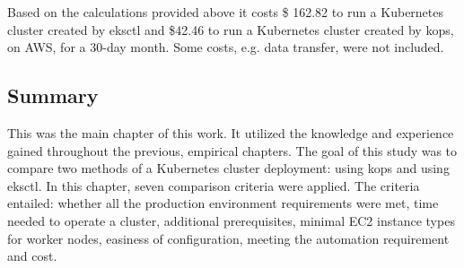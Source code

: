 Based on the calculations provided above it costs \$ 162.82 to run a Kubernetes cluster created by eksctl and \$42.46 to run a Kubernetes cluster created by kops, on AWS, for a 30-day month. Some costs, e.g. data transfer, were not included.




\subsection{Summary}

This was the main chapter of this work. It utilized the knowledge and experience gained throughout the previous, empirical chapters. The goal of this study was to compare two methods of a Kubernetes cluster deployment: using kops and using eksctl. In this chapter,  seven comparison criteria were applied. The criteria entailed: whether all the production environment requirements were met, time needed to operate a cluster, additional prerequisites, minimal EC2 instance types for worker nodes, easiness of configuration, meeting the automation requirement and cost.


